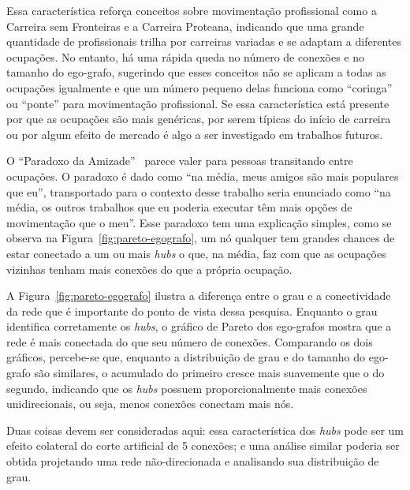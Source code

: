 \documentclass[12pt,a4paper]{article}
\begin{document}
Essa característica reforça conceitos sobre movimentação profissional como a Carreira sem Fronteiras e a Carreira Proteana, indicando que uma grande quantidade de profissionais trilha por carreiras variadas e se adaptam a diferentes ocupações. No entanto, há uma rápida queda no número de conexões e no tamanho do ego-grafo, sugerindo que esses conceitos não se aplicam a todas as ocupações igualmente e que um número pequeno delas funciona como \enquote{coringa} ou \enquote{ponte} para movimentação profissional. Se essa característica está presente por que as ocupações são mais genéricas, por serem típicas do início de carreira ou por algum efeito de mercado é algo a ser investigado em trabalhos futuros.

O \enquote{Paradoxo da Amizade}~\cite{Barabasi2016-rn} parece valer para pessoas transitando entre ocupações. O paradoxo é dado como \enquote{na média, meus amigos são mais populares que eu}, transportado para o contexto desse trabalho seria enunciado como \enquote{na média, os outros trabalhos que eu poderia executar têm mais opções de movimentação que o meu}. Esse paradoxo tem uma explicação simples, como se observa na Figura~\ref{fig:pareto-egografo}, um nó qualquer tem grandes chances de estar conectado a um ou mais \textit{hubs} o que, na média, faz com que as ocupações vizinhas tenham mais conexões do que a própria ocupação.

A Figura~\ref{fig:pareto-egografo} ilustra a diferença entre o grau e a conectividade da rede que é importante do ponto de vista dessa pesquisa. Enquanto o grau identifica corretamente os \textit{hubs}, o gráfico de Pareto dos ego-grafos mostra que a rede é mais conectada do que seu número de conexões. Comparando os dois gráficos, percebe-se que, enquanto a distribuição de grau e do tamanho do ego-grafo são similares, o acumulado do primeiro cresce mais suavemente que o do segundo, indicando que os \textit{hubs} possuem proporcionalmente mais conexões unidirecionais, ou seja, menos conexões conectam mais nós.

Duas coisas devem ser consideradas aqui: essa característica dos \textit{hubs} pode ser um efeito colateral do corte artificial de 5 conexões; e uma análise similar poderia ser obtida projetando uma rede não-direcionada e analisando sua distribuição de grau.
\end{document}
